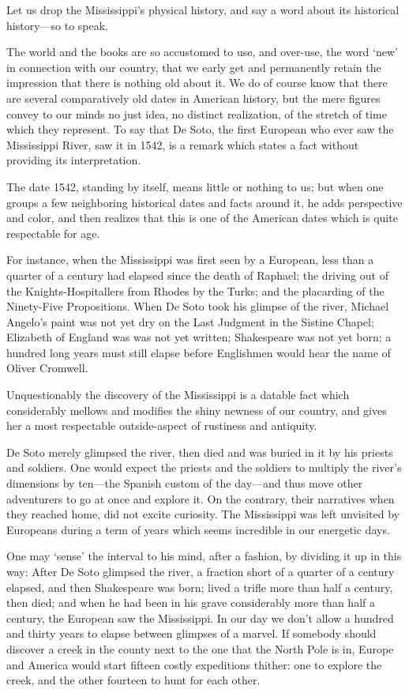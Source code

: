 \documentclass[../interior-demo.tex]{subfiles}
\begin{document}

Let us drop the Mississippi's physical history, and say a word about its
historical history---so to speak.

The world and the books are so accustomed to use, and over-use, the word
`new' in connection with our country, that we early get and permanently
retain the impression that there is nothing old about it. We do of
course know that there are several comparatively old dates in American
history, but the mere figures convey to our minds no just idea, no
distinct realization, of the stretch of time which they represent.
To say that De Soto, the first European who ever saw the Mississippi
River, saw it in 1542, is a remark which states a fact without
providing its interpretation.

The date 1542, standing by itself, means little or nothing to us; but
when one groups a few neighboring historical dates and facts around it,
he adds perspective and color, and then realizes that this is one of the
American dates which is quite respectable for age.

For instance, when the Mississippi was first seen by a European, less
than a quarter of a century had elapsed since the death of Raphael;
the driving out of the Knights-Hospitallers from Rhodes by
the Turks; and the placarding of the Ninety-Five Propositions.
When De Soto took his glimpse of the river,
Michael Angelo's paint was not yet dry on the Last
Judgment in the Sistine Chapel; Elizabeth of England was
 was not yet written; Shakespeare was not yet born;
a hundred long years must
still elapse before Englishmen would hear the name of Oliver Cromwell.

Unquestionably the discovery of the Mississippi is a datable fact which
considerably mellows and modifies the shiny newness of our country, and
gives her a most respectable outside-aspect of rustiness and antiquity.

De Soto merely glimpsed the river, then died and was buried in it by his
priests and soldiers. One would expect the priests and the soldiers
to multiply the river's dimensions by ten---the Spanish custom of the
day---and thus move other adventurers to go at once and explore it. On
the contrary, their narratives when they reached home, did not excite
 curiosity. The Mississippi was left unvisited by
Europeans during a term of years which seems incredible in our energetic days.

One may `sense' the interval to his mind, after a fashion, by dividing it
up in this way: After De Soto glimpsed the river, a fraction short of
a quarter of a century elapsed, and then Shakespeare was born; lived a
trifle more than half a century, then died; and when he had been in his
grave considerably more than half a century, the  European saw
the Mississippi. In our day we don't allow a hundred and thirty years to
elapse between glimpses of a marvel. If somebody should discover a creek
in the county next to the one that the North Pole is in, Europe and
America would start fifteen costly expeditions thither: one to explore
the creek, and the other fourteen to hunt for each other.
\end{document}
